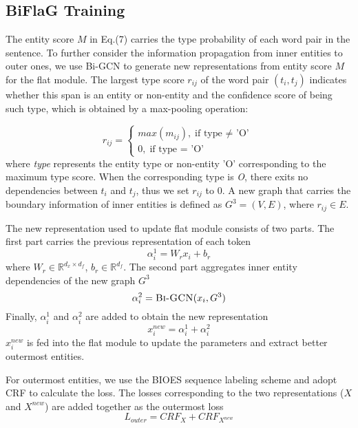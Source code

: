 \documentclass[11pt,a4paper]{article}
\begin{document}
\subsection{BiFlaG Training}
The entity score $M$ in Eq.(7) carries the type probability of each word pair in the sentence. To further consider the information propagation from inner entities to outer ones, we use Bi-GCN to generate new representations from entity score $M$ for the flat module. The largest type score $r_{ij}$ of the word pair $(t_i, t_j)$ indicates  whether this span is an entity or non-entity and the confidence score of being such type, which  is obtained by a max-pooling operation:

\begin{equation}
r_{ij} =\left\{
\begin{aligned}
max(m_{ij}), \text{if type $\neq$ 'O'} \\
0, \text{if type $=$ 'O'}
\end{aligned}
\right. 
\end{equation}
where \textit{type} represents the entity type or non-entity 'O' corresponding to the maximum type score. 
When the corresponding type is \textit{O}, there exits no dependencies between $t_i$ and $t_j$, thus we set $r_{ij}$ to 0.
A new graph that carries the boundary information of inner entities is defined as $G^3 = (V, E)$, where $r_{ij} \in E$.

 The new representation used to update flat module consists of two parts. The first part carries the previous representation of each token
\begin{equation}
    \alpha_i^1 = W_rx_i + b_r
\end{equation}
where $W_r \in \mathbb{R}^{d_x \times d_f}$, $b_r \in \mathbb{R}^{d_f}$.
The second part aggregates inner entity dependencies of the new graph $G^3$
\begin{equation}
    \alpha_i^2 = \Call{Bi-GCN}{x_i, G^3}
\end{equation}
Finally, $\alpha_i^1$ and $\alpha_i^2$ are added to obtain the new representation
\begin{equation}
    x_i^{new} = \alpha_i^1 +  \alpha_i^2
\end{equation}
 $x_i^{new}$ is fed into the flat module to update the parameters and extract better outermost entities.
 
 For outermost entities, we use the BIOES sequence labeling scheme and adopt CRF to calculate the loss. The losses corresponding to the two representations ($X$ and $X^{new}$) are added together as the outermost loss
\begin{equation}
    L_{outer} = CRF_{X} + CRF_{X^{new}}
\end{equation}
 
\end{document}
